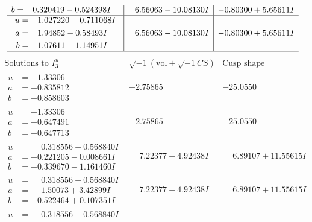 \documentclass[1p]{elsarticle_modified}
\theoremstyle{definition}
\newcommand{\I}{\sqrt{-1}}
\begin{document}
$$\begin{array}{c|c|c}
\begin{aligned}
b &= \phantom{-}0.320419 - 0.524398 I\end{aligned}
 & \phantom{-}6.56063 - 10.08130 I & -0.80300 + 5.65611 I \\ \hline\begin{aligned}
u &= -1.027220 - 0.711068 I \\
a &= \phantom{-}1.94852 - 0.58493 I \\
b &= \phantom{-}1.07611 + 1.14951 I\end{aligned}
 & \phantom{-}6.56063 - 10.08130 I & -0.80300 + 5.65611 I\\
 \hline 
 \end{array}$$\newpage$$\begin{array}{c|c|c}  
\text{Solutions to }I^u_{3}& \I (\text{vol} + \sqrt{-1}CS) & \text{Cusp shape}\\
 \hline 
\begin{aligned}
u &= -1.33306\phantom{ +0.000000I} \\
a &= -0.835812\phantom{ +0.000000I} \\
b &= -0.858603\phantom{ +0.000000I}\end{aligned}
 & -2.75865\phantom{ +0.000000I} & -25.0550\phantom{ +0.000000I} \\ \hline\begin{aligned}
u &= -1.33306\phantom{ +0.000000I} \\
a &= -0.647491\phantom{ +0.000000I} \\
b &= -0.647713\phantom{ +0.000000I}\end{aligned}
 & -2.75865\phantom{ +0.000000I} & -25.0550\phantom{ +0.000000I} \\ \hline\begin{aligned}
u &= \phantom{-}0.318556 + 0.568840 I \\
a &= -0.221205 - 0.008661 I \\
b &= -0.339670 - 1.161460 I\end{aligned}
 & \phantom{-}7.22377 - 4.92438 I & \phantom{-}6.89107 + 11.55615 I \\ \hline\begin{aligned}
u &= \phantom{-}0.318556 + 0.568840 I \\
a &= \phantom{-}1.50073 + 3.42899 I \\
b &= -0.522464 + 0.107351 I\end{aligned}
 & \phantom{-}7.22377 - 4.92438 I & \phantom{-}6.89107 + 11.55615 I \\ \hline\begin{aligned}
u &= \phantom{-}0.318556 - 0.568840 I \\

\end{aligned}
\end{array}$$
\end{document}
